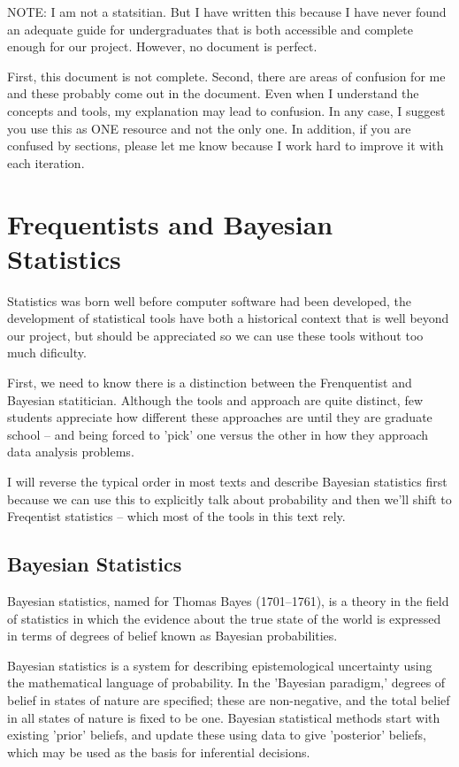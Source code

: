 \documentclass{article}\usepackage[]{graphicx}\usepackage[]{color}
\begin{document}
NOTE: I am not a statsitian. But I have written this because I have never found an adequate guide for undergraduates that is both accessible and complete enough for our project. However, no document is perfect.

First, this document is not complete. Second, there are areas of confusion for me and these probably come out in the document. Even when I understand the concepts and tools, my explanation may lead to confusion. In any case, I suggest you use this as ONE resource and not the only one. In addition, if you are confused by sections, please let me know because I work hard to improve it with each iteration. 

\section{Frequentists and Bayesian Statistics}

Statistics was born well before computer software had been developed, the development of statistical tools have both a historical context that is well beyond our project, but should be appreciated so we can use these tools without too much dificulty. 

First, we need to know there is a distinction between the Frenquentist and Bayesian statitician. Although the tools and approach are quite distinct, few students appreciate how different these approaches are until they are graduate school -- and being forced to 'pick' one versus the other in how they approach data analysis problems. 

I will reverse the typical order in most texts and describe Bayesian statistics first because we can use this to explicitly talk about probability and then we'll shift to Freqentist statistics -- which most of the tools in this text rely. 

\subsection{Bayesian Statistics}

Bayesian statistics, named for Thomas Bayes (1701–1761), is a theory in the field of statistics in which the evidence about the true state of the world is expressed in terms of degrees of belief known as Bayesian probabilities. 

Bayesian statistics is a system for describing epistemological uncertainty using the mathematical language of probability. In the 'Bayesian paradigm,' degrees of belief in states of nature are specified; these are non-negative, and the total belief in all states of nature is fixed to be one. Bayesian statistical methods start with existing 'prior' beliefs, and update these using data to give 'posterior' beliefs, which may be used as the basis for inferential decisions.
\end{document}
